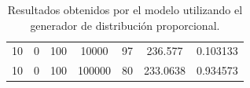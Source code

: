\documentclass[11pt,a4paper]{report}
\begin{document}
\begin{table}[H]
{\begin{tabular}{c|c|c|c|c|c|c}
10                                                                                   & 0                                                                                      & 100                                                                        & 10000                                                                     & 97                                                                                        & 236.577                                                                   & 0.103133              \\
10                                                                                   & 0                                                                                      & 100                                                                        & 100000                                                                    & 80                                                                                        & 233.0638                                                                  & 0.934573             
\end{tabular}%
}
\caption{Resultados obtenidos por el modelo utilizando el generador de distribución proporcional.}
\label{tabla5}
\end{table}
\end{document}
